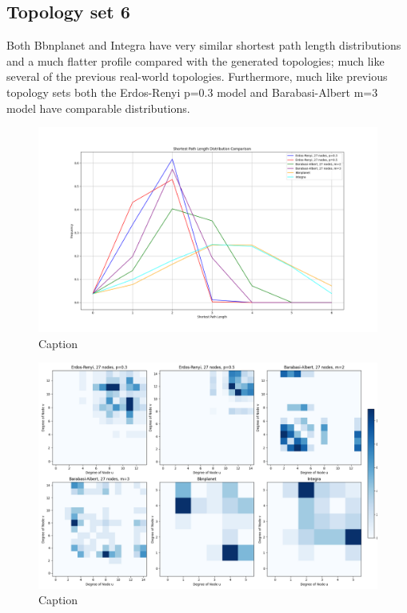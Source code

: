 \subsection{Topology set 6}
Both Bbnplanet and Integra have very similar shortest path length distributions and a much flatter profile compared with the generated topologies; much like several of the previous real-world topologies. Furthermore, much like previous topology sets both the Erdos-Renyi p=0.3 model and Barabasi-Albert m=3 model have comparable distributions. 
\begin{figure}
    \centering
    \includegraphics[width=0.9\linewidth]{images/FINAL-TOPO-COMP/line-27.png}
    \caption{Caption}
    \label{fig:enter-label}
\end{figure}

\begin{figure}
    \centering
    \includegraphics[width=0.9\linewidth]{images/FINAL-TOPO-COMP/Degree-correlation-matrices/27-matrix.png}
    \caption{Caption}
    \label{fig:enter-label}
\end{figure}

